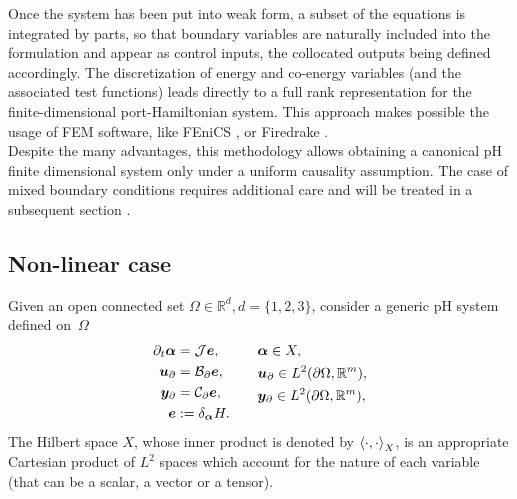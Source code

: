 Once the system has been put into weak form, a subset of the equations is integrated by parts, so that boundary variables are naturally included into the formulation and appear as control inputs, the collocated outputs being defined accordingly. The discretization of energy and co-energy variables (and the associated test functions) leads directly to a full rank representation for the finite-dimensional port-Hamiltonian system.  This approach makes possible the usage of FEM software, like FEniCS \cite{logg2012}, or Firedrake \cite{rathgeber2017firedrake}. \\

Despite the many advantages, this methodology allows obtaining a canonical pH finite dimensional system only under a uniform causality assumption. The case of mixed boundary conditions requires additional care and will be treated in a subsequent section .

\subsection{Non-linear case}
Given an open connected set $\Omega \in \mathbb{R}^d, d= \{1,2,3\}$, consider a generic pH system defined on~$\Omega$
\begin{equation}\label{eq:phsys2}
\begin{aligned}[t]
\partial_t {\bm{\alpha}} &= \mathcal{J}\displaystyle \bm{e}, \vspace{3pt}\\
\bm{u}_\partial &= \mathcal{B}_\partial  \displaystyle \bm{e}, \vspace{3pt}\\
\bm{y}_\partial &= \mathcal{C}_\partial \displaystyle \bm{e}, \vspace{3pt}\\
\bm{e} &:= \displaystyle \delta_{\bm{\alpha}}H.
\end{aligned} \qquad
\begin{aligned}[t]
&\bm{\alpha} \in X, \\
&\bm{u}_\partial \in L^2(\partial \Omega, \mathbb{R}^m), \\
&\bm{y}_\partial \in L^2(\partial \Omega, \mathbb{R}^m),
\end{aligned}
\end{equation}
The Hilbert space $X$, whose inner product is denoted by $\inner[X]{\cdot}{\cdot}$, is an appropriate Cartesian product of $L^2$ spaces which account for the nature of each variable (that can be a scalar, a vector or a tensor). \\

